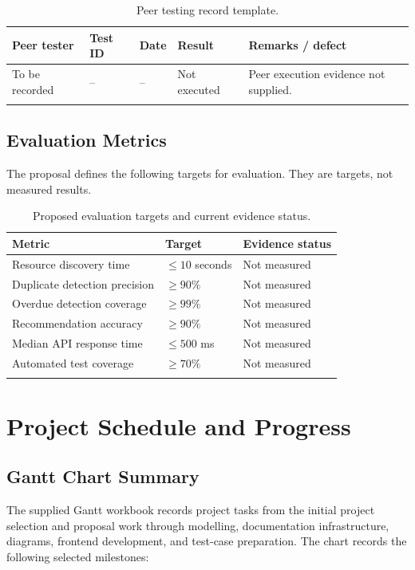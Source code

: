 \documentclass[12pt,a4paper]{report}
\begin{document}
\begin{longtable}{p{2.5cm}p{2cm}p{2cm}p{2cm}p{3cm}}
\toprule
\textbf{Peer tester} & \textbf{Test ID} & \textbf{Date} & \textbf{Result} & \textbf{Remarks / defect}\\
\midrule
To be recorded & -- & -- & Not executed & Peer execution evidence not supplied.\\
\bottomrule
\caption{Peer testing record template.}
\end{longtable}

\section{Evaluation Metrics}
The proposal defines the following targets for evaluation. They are targets, not measured results.

\begin{longtable}{p{6cm}p{3cm}p{3cm}}
\toprule
\textbf{Metric} & \textbf{Target} & \textbf{Evidence status}\\
\midrule
Resource discovery time & $\leq 10$ seconds & Not measured\\
Duplicate detection precision & $\geq 90\%$ & Not measured\\
Overdue detection coverage & $\geq 99\%$ & Not measured\\
Recommendation accuracy & $\geq 90\%$ & Not measured\\
Median API response time & $\leq 500$ ms & Not measured\\
Automated test coverage & $\geq 70\%$ & Not measured\\
\bottomrule
\caption{Proposed evaluation targets and current evidence status.}
\end{longtable}

\chapter{Project Schedule and Progress}

\section{Gantt Chart Summary}
The supplied Gantt workbook records project tasks from the initial project selection and proposal work through modelling, documentation infrastructure, diagrams, frontend development, and test-case preparation. The chart records the following selected milestones:
\end{document}
